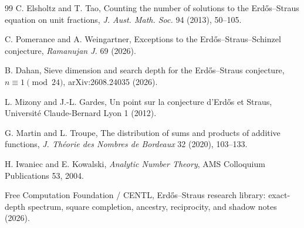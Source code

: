 \documentclass[11pt]{article}
\theoremstyle{definition}
\begin{document}
\begin{thebibliography}{99}
C. Elsholtz and T. Tao,
Counting the number of solutions to the Erd\H{o}s--Straus equation on unit fractions,
\emph{J. Aust. Math. Soc.} 94 (2013), 50--105.

C. Pomerance and A. Weingartner,
Exceptions to the Erd\H{o}s--Straus--Schinzel conjecture,
\emph{Ramanujan J.} 69 (2026).

B. Dahan,
Sieve dimension and search depth for the Erd\H{o}s--Straus conjecture, $n\equiv1\pmod{24}$,
arXiv:2608.24035 (2026).

L. Mizony and J.-L. Gardes,
Un point sur la conjecture d'Erd\H{o}s et Straus,
Universit\'e Claude-Bernard Lyon 1 (2012).

G. Martin and L. Troupe,
The distribution of sums and products of additive functions,
\emph{J. Th\'eorie des Nombres de Bordeaux} 32 (2020), 103--133.

H. Iwaniec and E. Kowalski,
\emph{Analytic Number Theory},
AMS Colloquium Publications 53, 2004.

Free Computation Foundation / CENTL,
Erd\H{o}s--Straus research library: exact-depth spectrum, square completion, ancestry, reciprocity, and shadow notes (2026).
\end{thebibliography}
\end{document}

